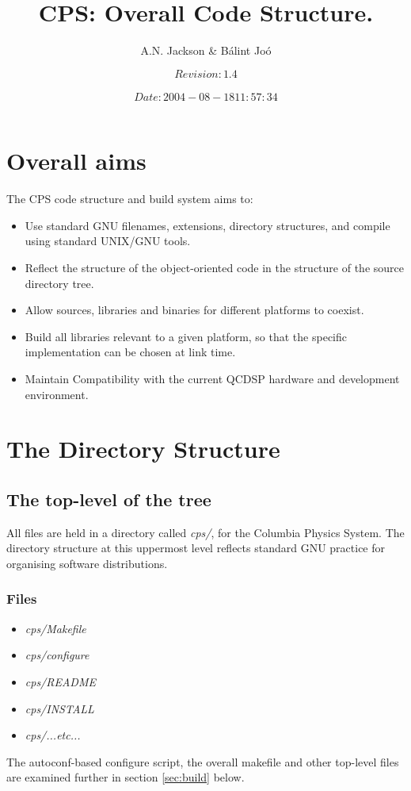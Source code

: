 \documentclass[12pt]{article}
\title{CPS: Overall Code Structure.}
\author{A.N. Jackson \& B\'{a}lint Jo\'{o}}
\date{\mbox{\small $$Revision: 1.4 $$  $$Date: 2004-08-18 11:57:34 $$}}
\begin{document}
\maketitle

\tableofcontents
\newpage

\section{Overall aims}
The CPS code structure and build system aims to:
\begin{itemize}
\setlength{\itemsep}{0.0cm}
 \item Use standard GNU filenames, extensions, directory structures, and
 compile using standard UNIX/GNU tools.
 \item Reflect the structure of the object-oriented code in the structure of
 the source directory tree.
 \item Allow sources, libraries and binaries for different platforms to coexist.
 \item Build all libraries relevant to a given platform, so that the specific
 implementation can be chosen at link time.
\item Maintain Compatibility with the current QCDSP hardware and development environment.
\end{itemize}

\section{The Directory Structure}
\label{sec:dirs}

\subsection{The top-level of the tree}
All files are held in a directory called \emph{cps/}, for the Columbia Physics System.
The directory structure at this uppermost level reflects standard GNU practice
for organising software distributions.

\subsubsection{Files}
\begin{itemize}
\setlength{\itemsep}{0.0cm}
 \item \emph{cps/Makefile}
 \item \emph{cps/configure}
 \item \emph{cps/README}
 \item \emph{cps/INSTALL}
 \item \emph{cps/...etc...}
\end{itemize}
The autoconf-based configure script, the overall makefile and other top-level 
files are examined further in section \ref{sec:build} below.
\end{document}
